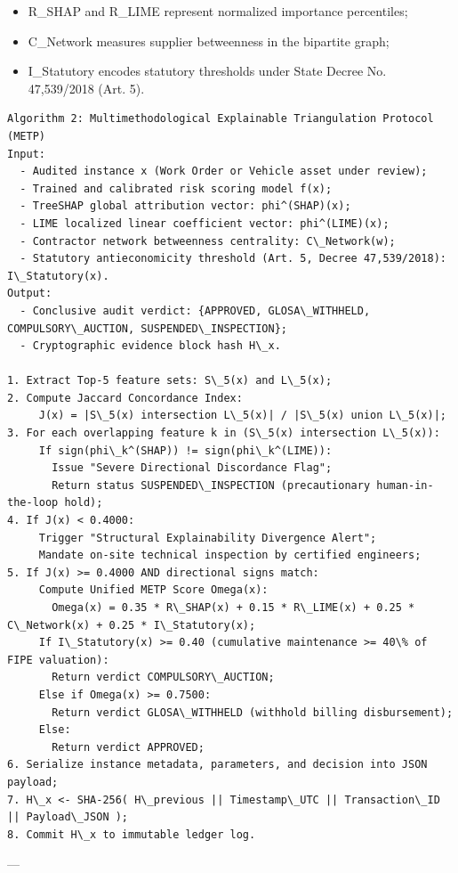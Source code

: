 \documentclass[10pt,a4paper,journal]{article}
\begin{document}
\begin{itemize}
\item R\_SHAP and R\_LIME represent normalized importance percentiles;
\end{itemize}
\begin{itemize}
\item C\_Network measures supplier betweenness in the bipartite graph;
\end{itemize}
\begin{itemize}
\item I\_Statutory encodes statutory thresholds under State Decree No. 47,539/2018 (Art. 5).
\end{itemize}
\begin{verbatim}
Algorithm 2: Multimethodological Explainable Triangulation Protocol (METP)
Input:
  - Audited instance x (Work Order or Vehicle asset under review);
  - Trained and calibrated risk scoring model f(x);
  - TreeSHAP global attribution vector: phi^(SHAP)(x);
  - LIME localized linear coefficient vector: phi^(LIME)(x);
  - Contractor network betweenness centrality: C\_Network(w);
  - Statutory antieconomicity threshold (Art. 5, Decree 47,539/2018): I\_Statutory(x).
Output:
  - Conclusive audit verdict: {APPROVED, GLOSA\_WITHHELD, COMPULSORY\_AUCTION, SUSPENDED\_INSPECTION};
  - Cryptographic evidence block hash H\_x.

1. Extract Top-5 feature sets: S\_5(x) and L\_5(x);
2. Compute Jaccard Concordance Index:
     J(x) = |S\_5(x) intersection L\_5(x)| / |S\_5(x) union L\_5(x)|;
3. For each overlapping feature k in (S\_5(x) intersection L\_5(x)):
     If sign(phi\_k^(SHAP)) != sign(phi\_k^(LIME)):
       Issue "Severe Directional Discordance Flag";
       Return status SUSPENDED\_INSPECTION (precautionary human-in-the-loop hold);
4. If J(x) < 0.4000:
     Trigger "Structural Explainability Divergence Alert";
     Mandate on-site technical inspection by certified engineers;
5. If J(x) >= 0.4000 AND directional signs match:
     Compute Unified METP Score Omega(x):
       Omega(x) = 0.35 * R\_SHAP(x) + 0.15 * R\_LIME(x) + 0.25 * C\_Network(x) + 0.25 * I\_Statutory(x);
     If I\_Statutory(x) >= 0.40 (cumulative maintenance >= 40\% of FIPE valuation):
       Return verdict COMPULSORY\_AUCTION;
     Else if Omega(x) >= 0.7500:
       Return verdict GLOSA\_WITHHELD (withhold billing disbursement);
     Else:
       Return verdict APPROVED;
6. Serialize instance metadata, parameters, and decision into JSON payload;
7. H\_x <- SHA-256( H\_previous || Timestamp\_UTC || Transaction\_ID || Payload\_JSON );
8. Commit H\_x to immutable ledger log.
\end{verbatim}
---
\end{document}
